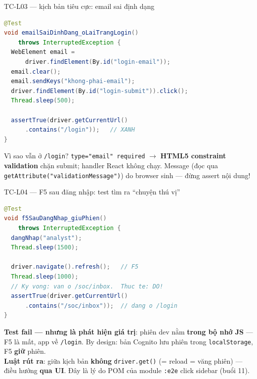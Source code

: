 \documentclass[aspectratio=169,12pt]{beamer}
\begin{document}
\begin{frame}[fragile]{TC-L03 --- kịch bản tiêu cực: email sai định dạng}
\begin{lstlisting}[language=java,basicstyle=\ttfamily\scriptsize]
@Test
void emailSaiDinhDang_oLaiTrangLogin()
    throws InterruptedException {
  WebElement email =
      driver.findElement(By.id("login-email"));
  email.clear();
  email.sendKeys("khong-phai-email");
  driver.findElement(By.id("login-submit")).click();
  Thread.sleep(500);

  assertTrue(driver.getCurrentUrl()
      .contains("/login"));   // XANH
}
\end{lstlisting}

  \begin{block}{Vì sao vẫn ở \texttt{/login}?}
    \texttt{type="email" required} $\to$ \textbf{HTML5 constraint validation}
    chặn submit; handler React không chạy. Message (đọc qua
    \texttt{getAttribute("validationMessage")}) do browser sinh --- đừng
    assert nội dung!
  \end{block}
\end{frame}

\begin{frame}[fragile]{TC-L04 --- F5 sau đăng nhập: test tìm ra ``chuyện thú vị''}
\begin{lstlisting}[language=java,basicstyle=\ttfamily\scriptsize]
@Test
void f5SauDangNhap_giuPhien()
    throws InterruptedException {
  dangNhap("analyst");
  Thread.sleep(1500);

  driver.navigate().refresh();   // F5
  Thread.sleep(1000);
  // Ky vong: van o /soc/inbox.  Thuc te: DO!
  assertTrue(driver.getCurrentUrl()
      .contains("/soc/inbox"));  // dang o /login
}
\end{lstlisting}

  {\small \textbf{Test fail --- nhưng là phát hiện giá trị}: phiên dev nằm
  \textbf{trong bộ nhớ JS} --- F5 là mất, app về \texttt{/login}. By design:
  bản Cognito lưu phiên trong \texttt{localStorage}, F5 \textbf{giữ} phiên.\\[0.25em]
  \textbf{Luật rút ra}: giữa kịch bản \textbf{không} \texttt{driver.get()}
  (= reload = văng phiên) --- điều hướng \textbf{qua UI}. Đây là lý do POM
  của module \texttt{:e2e} click sidebar (buổi 11).}
\end{frame}

\end{document}
